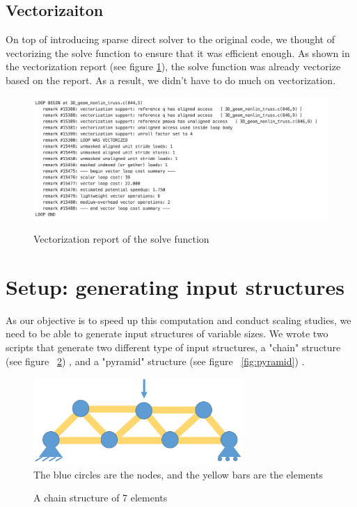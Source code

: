 \documentclass[11pt]{article}
\begin{document}
\subsection{Vectorizaiton}
On top of introducing sparse direct solver to the original code, we thought of vectorizing the solve function to ensure that it was efficient enough. As shown in the vectorization report (see figure \ref{fig:vectorization}), the solve function was already vectorize based on the report. As a result, we didn't have to do much on vectorization. 

\begin{figure}[h]
	\begin{center}
		
		\caption{Vectorization report of the solve function}
		\includegraphics[width=12cm]{vectorization}
		\label{fig:vectorization}
	\end{center}
	
\end{figure}

\section{Setup: generating input structures}\label{sec:setup}

As our objective is to speed up this computation and conduct scaling studies, we need to be able to generate input structures of variable sizes.
We wrote two scripts that generate two different type of input structures, a "chain" structure (see figure ~\ref{fig:chain}) , and a "pyramid" structure (see figure ~\ref{fig:pyramid}) .


\begin{figure}[h]
\begin{center}

\caption{A chain structure of 7 elements}
\includegraphics[width=8cm]{chain}
\label{fig:chain}
\\
The blue circles are the nodes, and the yellow bars are the elements
\end{center}

\end{figure}
\end{document}
